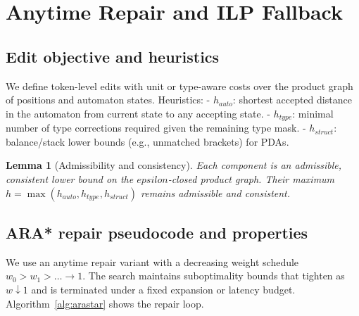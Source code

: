 \documentclass{article}
\def\epsilon{epsilon}%
\def\mathrm#1{#1}%
\newtheorem{lemma}{Lemma}
\begin{document}
\section{Anytime Repair and ILP Fallback}
\subsection{Edit objective and heuristics}
We define token-level edits with unit or type-aware costs over the product graph of positions and automaton states. Heuristics:
- $h_{\mathrm{auto}}$: shortest accepted distance in the automaton from current state to any accepting state.
- $h_{\mathrm{type}}$: minimal number of type corrections required given the remaining type mask.
- $h_{\mathrm{struct}}$: balance/stack lower bounds (e.g., unmatched brackets) for PDAs.

\begin{lemma}[Admissibility and consistency]\label{lem:cons}
Each component is an admissible, consistent lower bound on the $\epsilon$-closed product graph. Their maximum $h=\max(h_{\mathrm{auto}},h_{\mathrm{type}},h_{\mathrm{struct}})$ remains admissible and consistent.
\end{lemma}

\subsection{ARA* repair pseudocode and properties}
We use an anytime repair variant with a decreasing weight schedule $w_0>w_1>\dots\to 1$. The search maintains suboptimality bounds that tighten as $w\downarrow 1$ and is terminated under a fixed expansion or latency budget. Algorithm~\ref{alg:arastar} shows the repair loop.
\end{document}

